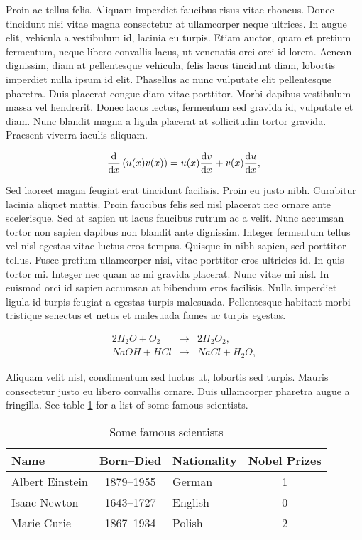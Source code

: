 \documentclass[12pt, a4paper]{article}
\begin{document}
Proin ac tellus felis. Aliquam imperdiet faucibus risus vitae rhoncus. Donec tincidunt nisi vitae magna consectetur at ullamcorper neque ultrices. In augue elit, vehicula a vestibulum id, lacinia eu turpis. Etiam auctor, quam et pretium fermentum, neque libero convallis lacus, ut venenatis orci orci id lorem. Aenean dignissim, diam at pellentesque vehicula, felis lacus tincidunt diam, lobortis imperdiet nulla ipsum id elit. Phasellus ac nunc vulputate elit pellentesque pharetra. Duis placerat congue diam vitae porttitor. Morbi dapibus vestibulum massa vel hendrerit. Donec lacus lectus, fermentum sed gravida id, vulputate et diam. Nunc blandit magna a ligula placerat at sollicitudin tortor gravida. Praesent viverra iaculis aliquam.

\begin{equation}
\label{eq.2}\frac{\mathrm{d}}{\mathrm{d}x}\left(u(x)v(x)\right)=u(x)\frac{\mathrm{d}v}{\mathrm{d}x}+v(x)\frac{\mathrm{d}u}{\mathrm{d}x},\\
\end{equation}

Sed laoreet magna feugiat erat tincidunt facilisis. Proin eu justo nibh. Curabitur lacinia aliquet mattis. Proin faucibus felis sed nisl placerat nec ornare ante scelerisque. Sed at sapien ut lacus faucibus rutrum ac a velit. Nunc accumsan tortor non sapien dapibus non blandit ante dignissim. Integer fermentum tellus vel nisl egestas vitae luctus eros tempus. Quisque in nibh sapien, sed porttitor tellus. Fusce pretium ullamcorper nisi, vitae porttitor eros ultricies id. In quis tortor mi. Integer nec quam ac mi gravida placerat. Nunc vitae mi nisl. In euismod orci id sapien accumsan at bibendum eros facilisis. Nulla imperdiet ligula id turpis feugiat a egestas turpis malesuada. Pellentesque habitant morbi tristique senectus et netus et malesuada fames ac turpis egestas.

\begin{eqnarray}
\label{eq.3}2H_2O+O_2&\longrightarrow& 2H_2O_2,\\
\label{eq.4}NaOH+HCl&\longrightarrow& NaCl + H_2O,
\end{eqnarray}

Aliquam velit nisl, condimentum sed luctus ut, lobortis sed turpis. Mauris consectetur justo eu libero convallis ornare. Duis ullamcorper pharetra augue a fringilla. See table \ref{tab:1} for a list of some famous scientists.

\begin{table}
   \begin{center}
      \begin{tabular}{l|c|l|c}
         Name & Born--Died & Nationality & Nobel Prizes\\
         \hline
         Albert Einstein & 1879--1955 & German & 1\\
         Isaac Newton & 1643--1727 & English & 0\\
         Marie Curie & 1867--1934 & Polish & 2
      \end{tabular}
      \caption{Some famous scientists}
      \label{tab:1}
   \end{center}
\end{table}
\end{document}
